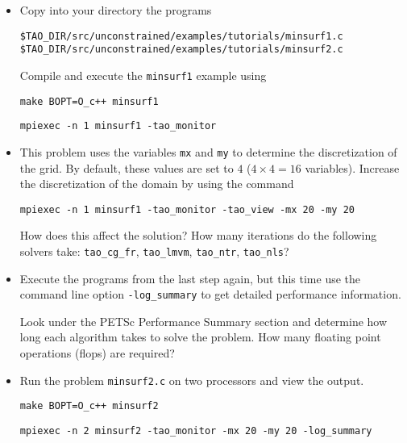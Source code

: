 \documentclass[11pt]{article}
\begin{document}
\begin{enumerate}
\begin{itemize}

\item
Copy into your directory the programs
\begin{alltt}
\$TAO_DIR/src/unconstrained/examples/tutorials/minsurf1.c
\$TAO_DIR/src/unconstrained/examples/tutorials/minsurf2.c

\end{alltt}
    
Compile and execute the \texttt{minsurf1} example using
    
\quad \texttt{make BOPT=O\_c++ minsurf1}

\quad \texttt{mpiexec -n 1 minsurf1 -tao\_monitor}

\item
This problem uses the variables {\tt mx} and {\tt my} to determine
the discretization of the grid.  By default, these values are set to
$4$ ($4 \times 4 = 16$ variables). Increase the discretization of the 
domain by using the command 

\quad \texttt{mpiexec -n 1 minsurf1 -tao\_monitor -tao\_view -mx 20 -my 20}

How does this affect the solution?
How many iterations do the following solvers take: \texttt{tao\_cg\_fr},
\texttt{tao\_lmvm}, \texttt{tao\_ntr}, \texttt{tao\_nls}?

\item
Execute the programs from the last step again, but this time use the command line option 
\texttt{-log\_summary} to get detailed performance information.

Look under the PETSc Performance Summary section and determine how long
each algorithm takes to solve the problem. How many floating point operations (flops) are required? 


\item
Run the problem \texttt{minsurf2.c} on two processors and view the output.

\quad \texttt{make BOPT=O\_c++ minsurf2}

\quad \texttt{mpiexec -n 2 minsurf2 -tao\_monitor -mx 20 -my 20 -log\_summary}

\end{itemize}

\end{enumerate}
\end{document}
